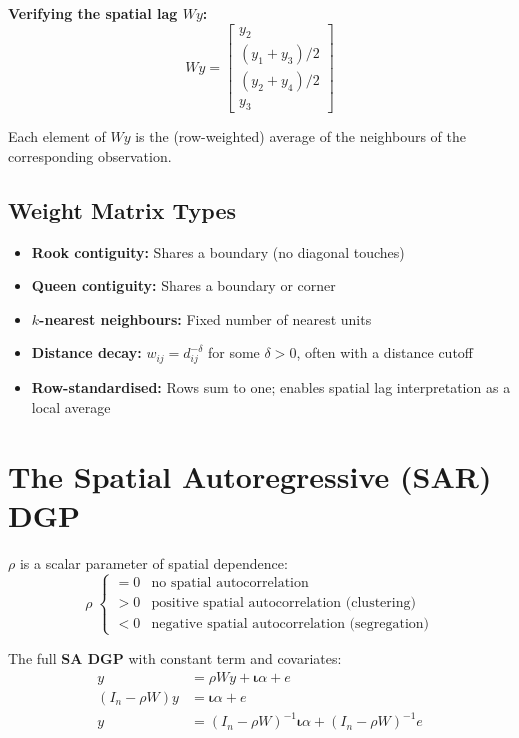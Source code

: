\noindent\textbf{Verifying the spatial lag $Wy$:}
\begin{equation}
  Wy = \begin{bmatrix}y_2\\(y_1+y_3)/2\\(y_2+y_4)/2\\y_3\end{bmatrix}
\end{equation}

Each element of $Wy$ is the (row-weighted) average of the neighbours of the
corresponding observation.

\subsection{Weight Matrix Types}

\begin{itemize}
  \item \textbf{Rook contiguity:} Shares a boundary (no diagonal touches)
  \item \textbf{Queen contiguity:} Shares a boundary or corner
  \item \textbf{$k$-nearest neighbours:} Fixed number of nearest units
  \item \textbf{Distance decay:} $w_{ij} = d_{ij}^{-\delta}$ for some
    $\delta > 0$, often with a distance cutoff
  \item \textbf{Row-standardised:} Rows sum to one; enables spatial lag
    interpretation as a local average
\end{itemize}


\section{The Spatial Autoregressive (SAR) DGP}
\label{sec_SARDGP}

$\rho$ is a scalar parameter of spatial dependence:
\begin{equation}
  \rho \;\begin{cases}
    = 0 & \text{no spatial autocorrelation} \\
    > 0 & \text{positive spatial autocorrelation (clustering)} \\
    < 0 & \text{negative spatial autocorrelation (segregation)}
  \end{cases}
\end{equation}

The full \textbf{SA DGP} with constant term and covariates:
\begin{align}
  y &= \rho Wy + \boldsymbol{\iota}\alpha + e \\
  (I_n - \rho W)y &= \boldsymbol{\iota}\alpha + e \\
  y &= (I_n - \rho W)^{-1}\boldsymbol{\iota}\alpha + (I_n - \rho W)^{-1}e
\end{align}


